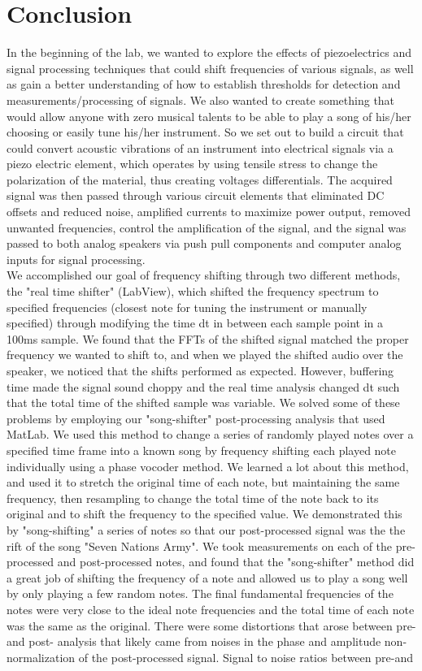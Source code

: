 \documentclass{article}
\begin{document}
\section{Conclusion}
    In the beginning of the lab, we wanted to explore the effects of piezoelectrics and signal processing techniques that could shift frequencies of various signals, as well as gain a better understanding of how to establish thresholds for detection and measurements/processing of signals. We also wanted to create something that would allow anyone with zero musical talents to be able to play a song of his/her choosing or easily tune his/her instrument. So we set out to build a circuit that could convert acoustic vibrations of an instrument into electrical signals via a piezo electric element, which operates by using tensile stress to change the polarization of the material, thus creating voltages differentials. The acquired signal was then passed through various circuit elements that eliminated DC offsets and reduced noise, amplified currents to maximize power output, removed unwanted frequencies, control the amplification of the signal, and the signal was passed to both analog speakers via push pull components and computer analog inputs for signal processing.\\\indent We accomplished our goal of frequency shifting through two different methods, the "real time shifter" (LabView), which shifted the frequency spectrum to specified frequencies (closest note for tuning the instrument or manually specified) through modifying the time dt in between each sample point in a 100ms sample. We found that the FFTs of the shifted signal matched the proper frequency we wanted to shift to, and when we played the shifted audio over the speaker, we noticed that the shifts performed as expected. However, buffering time made the signal sound choppy and the real time analysis changed dt such that the total time of the shifted sample was variable. We solved some of these problems by employing our "song-shifter" post-processing analysis that used MatLab. We used this method to change a series of randomly played notes over a specified time frame into a known song by frequency shifting each played note individually using a phase vocoder method. We learned a lot about this method, and used it to stretch the original time of each note, but maintaining the same frequency, then resampling to change the total time of the note back to its original and to shift the frequency to the specified value. We demonstrated this by "song-shifting" a series of notes so that our post-processed signal was the the rift of the song "Seven Nations Army". We took measurements on each of the pre-processed and post-processed notes, and found that the "song-shifter" method did a great job of shifting the frequency of a note and allowed us to play a song well by only playing a few random notes. The final fundamental frequencies of the notes were very close to the ideal note frequencies and the total time of each note was the same as the original. There were some distortions that arose between pre- and post- analysis that likely came from noises in the phase and amplitude non-normalization of the post-processed signal. Signal to noise ratios between pre-and 
\end{document}
